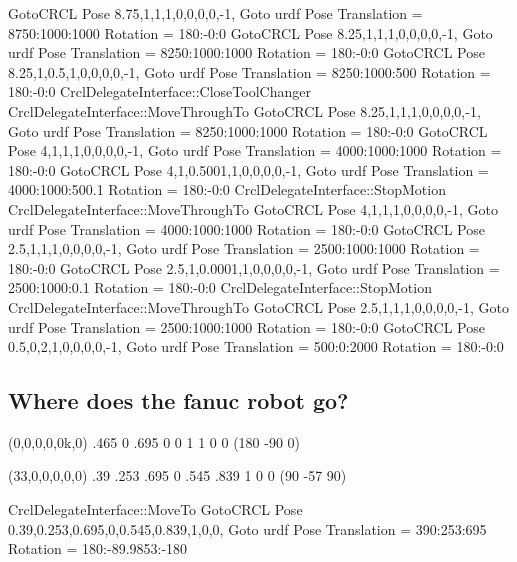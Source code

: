 \begin{DoxyVerb}
GotoCRCL Pose 8.75,1,1,1,0,0,0,0,-1,
Goto urdf Pose Translation = 8750:1000:1000
Rotation = 180:-0:0
GotoCRCL Pose 8.25,1,1,1,0,0,0,0,-1,
Goto urdf Pose Translation = 8250:1000:1000
Rotation = 180:-0:0
GotoCRCL Pose 8.25,1,0.5,1,0,0,0,0,-1,
Goto urdf Pose Translation = 8250:1000:500
Rotation = 180:-0:0
CrclDelegateInterface::CloseToolChanger
CrclDelegateInterface::MoveThroughTo
GotoCRCL Pose 8.25,1,1,1,0,0,0,0,-1,
Goto urdf Pose Translation = 8250:1000:1000
Rotation = 180:-0:0
GotoCRCL Pose 4,1,1,1,0,0,0,0,-1,
Goto urdf Pose Translation = 4000:1000:1000
Rotation = 180:-0:0
GotoCRCL Pose 4,1,0.5001,1,0,0,0,0,-1,
Goto urdf Pose Translation = 4000:1000:500.1
Rotation = 180:-0:0
CrclDelegateInterface::StopMotion
CrclDelegateInterface::MoveThroughTo
GotoCRCL Pose 4,1,1,1,0,0,0,0,-1,
Goto urdf Pose Translation = 4000:1000:1000
Rotation = 180:-0:0
GotoCRCL Pose 2.5,1,1,1,0,0,0,0,-1,
Goto urdf Pose Translation = 2500:1000:1000
Rotation = 180:-0:0
GotoCRCL Pose 2.5,1,0.0001,1,0,0,0,0,-1,
Goto urdf Pose Translation = 2500:1000:0.1
Rotation = 180:-0:0
CrclDelegateInterface::StopMotion
CrclDelegateInterface::MoveThroughTo
GotoCRCL Pose 2.5,1,1,1,0,0,0,0,-1,
Goto urdf Pose Translation = 2500:1000:1000
Rotation = 180:-0:0
GotoCRCL Pose 0.5,0,2,1,0,0,0,0,-1,
Goto urdf Pose Translation = 500:0:2000
Rotation = 180:-0:0
\end{DoxyVerb}


\subsection*{Where does the fanuc robot go? }

\begin{DoxyVerb}(0,0,0,0,0k,0)
.465 0 .695 0 0 1 1 0 0  (180 -90 0)

(33,0,0,0,0,0)
.39 .253 .695  0 .545 .839 1  0 0   (90 -57 90)


CrclDelegateInterface::MoveTo
GotoCRCL Pose 0.39,0.253,0.695,0,0.545,0.839,1,0,0,
Goto urdf Pose Translation = 390:253:695
Rotation = 180:-89.9853:-180
\end{DoxyVerb}



